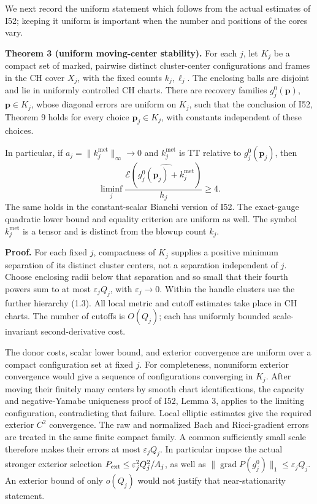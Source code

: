 \documentclass[
  10pt,
]{article}
\begin{document}
We next record the uniform statement which follows from the actual
estimates of I52; keeping it uniform is important when the number and
positions of the cores vary.

\textbf{Theorem 3 (uniform moving-center stability).} For each \(j\),
let \(K_j\) be a compact set of marked, pairwise distinct cluster-center
configurations and frames in the CH cover \(X_j\), with the fixed counts
\(k_j,\ell_j\). The enclosing balls are disjoint and lie in uniformly
controlled CH charts. There are recovery families \(g_j^0(\mathbf p)\),
\(\mathbf p\in K_j\), whose diagonal errors are uniform on \(K_j\), such
that the conclusion of I52, Theorem 9 holds for every choice
\(\mathbf p_j\in K_j\), with constants independent of these choices.

In particular, if \(a_j=\|k_j^{\mathrm{met}}\|_\infty\to0\) and
\(k_j^{\mathrm{met}}\) is TT relative to \(g_j^0(\mathbf p_j)\), then \[
 \liminf_j
 \frac{\mathcal E\!\left(\widehat{g_j^0(\mathbf p_j)
                                    +k_j^{\mathrm{met}}}\right)}
      {h_j}\ge4.                                             \tag{4.3}
\] The same holds in the constant-scalar Bianchi version of I52. The
exact-gauge quadratic lower bound and equality criterion are uniform as
well. The symbol \(k_j^{\mathrm{met}}\) is a tensor and is distinct from
the blowup count \(k_j\).

\textbf{Proof.} For each fixed \(j\), compactness of \(K_j\) supplies a
positive minimum separation of its distinct cluster centers, not a
separation independent of \(j\). Choose enclosing radii below that
separation and so small that their fourth powers sum to at most
\(\varepsilon_jQ_j\), with \(\varepsilon_j\to0\). Within the handle
clusters use the further hierarchy (1.3). All local metric and cutoff
estimates take place in CH charts. The number of cutoffs is \(O(Q_j)\);
each has uniformly bounded scale-invariant second-derivative cost.

The donor costs, scalar lower bound, and exterior convergence are
uniform over a compact configuration set at fixed \(j\). For
completeness, nonuniform exterior convergence would give a sequence of
configurations converging in \(K_j\). After moving their finitely many
centers by smooth chart identifications, the capacity and
negative-Yamabe uniqueness proof of I52, Lemma 3, applies to the
limiting configuration, contradicting that failure. Local elliptic
estimates give the required exterior \(C^2\) convergence. The raw and
normalized Bach and Ricci-gradient errors are treated in the same finite
compact family. A common sufficiently small scale therefore makes their
errors at most \(\varepsilon_jQ_j\). In particular impose the actual
stronger exterior selection \(P_{\rm ext}\le\varepsilon_j^2Q_j^2/A_j\),
as well as \(\|\operatorname{grad}P(g_j^0)\|_1\le\varepsilon_jQ_j\). An
exterior bound of only \(o(Q_j)\) would not justify that
near-stationarity statement.
\end{document}
